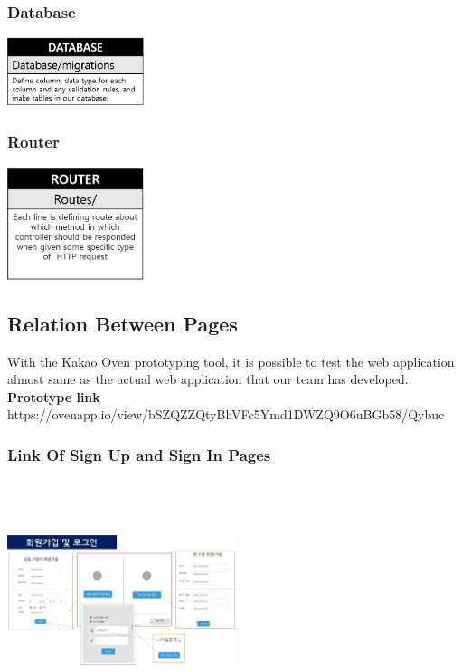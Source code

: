 \documentclass[letterpaper, 10 pt, conference]{ieeeconf}  %
\begin{document}
\begin{center}
\subsubsection{Database\\}
\includegraphics[width = 0.3\textwidth]{Architecture/Database.png}
\subsubsection{Router\\}
\includegraphics[width = 0.3\textwidth]{Architecture/Router.png}
\end{center}

\subsection{Relation Between Pages}
With the Kakao Oven prototyping tool, it is possible to test the web application almost same as the actual web application that our team has developed.\\
\textbf{Prototype link}\\https://ovenapp.io/view/bSZQZZQtyBhVFc5Ymd1DWZQ9O6uBGb58/Qybuc

\subsubsection{Link Of Sign Up and Sign In Pages\\}
\includegraphics[width=0.5\textwidth,height = 7cm]{Oven/17_linkOfSignUpPages.png}
\end{document}
